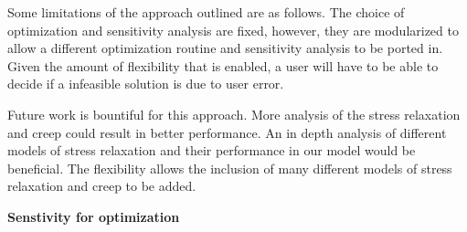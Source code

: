 \documentclass[10pt]{article}
\begin{document}
Some limitations of the approach outlined are as follows. The choice of optimization and sensitivity analysis are fixed, however, they are modularized to allow a different optimization routine and sensitivity analysis to be ported in. Given the amount of flexibility that is enabled, a user will have to be able to decide if a infeasible solution is due to user error. 

Future work is bountiful for this approach. More analysis of the stress relaxation and creep could result in better performance. An in depth analysis of different models of stress relaxation and their performance in our model would be beneficial. The flexibility allows the inclusion of many different models of stress relaxation and creep to be added. 

\textbf{Senstivity for optimization} 





\vfill\pagebreak

	
	


\end{document}
